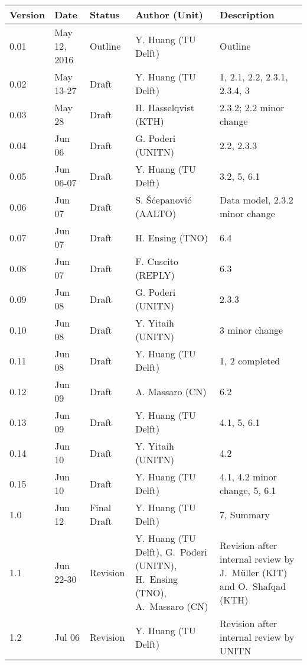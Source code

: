 {\small
\begin{tabularx}{\textwidth}{|l|l|l|>{\raggedright\arraybackslash}p{4cm}|X|}
\hline
\textbf{Version}	& \textbf{Date} &	\textbf{Status} &	\textbf{Author (Unit)} &	\textbf{Description}  \\ \hline
0.01 & May 12, 2016 & Outline & Y. Huang (TU Delft) & Outline\\ \hline
0.02 & May 13-27 & Draft & Y. Huang (TU Delft) & 1, 2.1, 2.2, 2.3.1, 2.3.4, 3\\ \hline
0.03 & May 28 & Draft & H. Hasselqvist (KTH) &  2.3.2; 2.2 minor change\\ \hline
0.04 & Jun 06 & Draft &  G. Poderi (UNITN) & 2.2, 2.3.3 \\ \hline
0.05 & Jun 06-07 & Draft & Y. Huang (TU Delft) & 3.2, 5, 6.1 \\ \hline
0.06 & Jun 07 & Draft &  S. \v{S}\'{c}epanovi\'{c} (AALTO) & Data model, 2.3.2 minor change \\ \hline
0.07 & Jun 07 & Draft &  H. Ensing (TNO) & 6.4 \\ \hline
0.08 & Jun 07 & Draft &  F. Cuscito (REPLY) & 6.3 \\ \hline
0.09 & Jun 08 & Draft &  G. Poderi (UNITN) & 2.3.3 \\ \hline
0.10 & Jun 08 & Draft &  Y. Yitaih (UNITN) & 3 minor change \\ \hline
0.11 & Jun 08 & Draft & Y. Huang (TU Delft) & 1, 2 completed \\ \hline
0.12 & Jun 09 & Draft & A. Massaro  (CN) & 6.2 \\ \hline
0.13 & Jun 09 & Draft & Y. Huang (TU Delft) & 4.1, 5, 6.1 \\ \hline
0.14 & Jun 10 & Draft & Y. Yitaih (UNITN) & 4.2 \\ \hline
0.15 & Jun 10 & Draft & Y. Huang (TU Delft) & 4.1, 4.2 minor change, 5, 6.1 \\ \hline
1.0 & Jun 12 & Final Draft & Y. Huang (TU Delft) & 7, Summary \\ \hline
1.1 & Jun 22-30 & Revision & Y. Huang (TU Delft), G.~Poderi (UNITN),  H.~Ensing (TNO), A.~Massaro  (CN)  & Revision after internal review by  J.~M\"uller (KIT) and O.~Shafqad (KTH) \\ \hline
1.2 & Jul 06 & Revision & Y. Huang (TU Delft) & Revision after internal review by UNITN \\ \hline
\end{tabularx}
}


